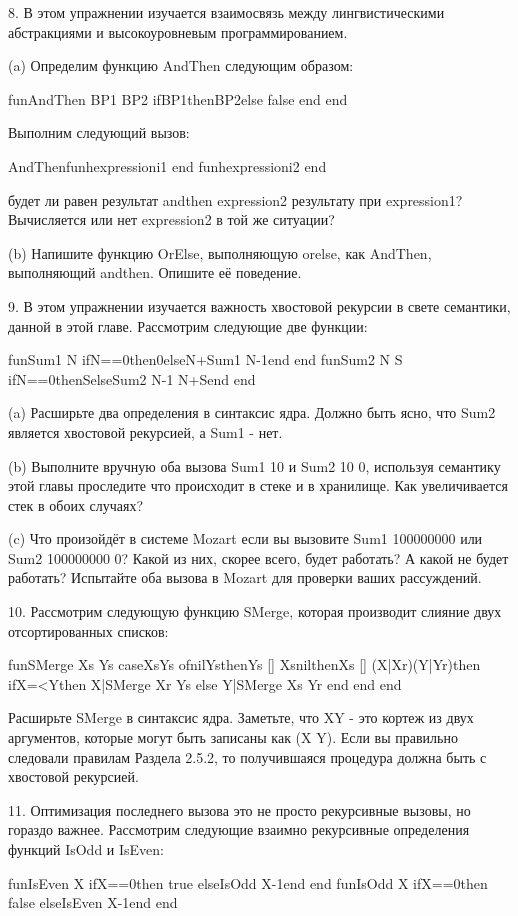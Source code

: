 8. В этом упражнении изучается взаимосвязь между лингвистическими абстракциями и высокоуровневым программированием.

(a) Определим функцию AndThen следующим образом:

fun{AndThen BP1 BP2}
if{BP1}then{BP2}else false end
end

Выполним следующий вызов:

{AndThenfun{}hexpressioni1 end
fun{}hexpressioni2 end}

будет ли равен результат andthen expression2 результату при expression1? Вычисляется или нет expression2 в той же ситуации?

(b) Напишите функцию OrElse, выполняющую orelse, как AndThen, выполняющий andthen. Опишите её поведение.

9. В этом упражнении изучается важность хвостовой рекурсии в свете семантики, данной в этой главе. Рассмотрим следующие две функции:

fun{Sum1 N}
ifN==0then0elseN+{Sum1 N-1}end
end
fun{Sum2 N S}
ifN==0thenSelse{Sum2 N-1 N+S}end
end

(a) Расширьте два определения в синтаксис ядра. Должно быть ясно, что Sum2 является хвостовой рекурсией, а Sum1 - нет.

(b) Выполните вручную оба вызова {Sum1 10} и {Sum2 10 0}, используя семантику этой главы проследите что происходит в стеке и в хранилище. Как увеличивается стек в обоих случаях?

(c) Что произойдёт в системе Mozart если вы вызовите {Sum1 100000000} или {Sum2 100000000 0}? Какой из них, скорее всего, будет работать? А какой не будет работать? Испытайте оба вызова в Mozart для проверки ваших рассуждений.

10. Рассмотрим следующую функцию SMerge, которая производит слияние двух отсортированных списков:

fun{SMerge Xs Ys}
caseXsYs
ofnilYsthenYs
[] XsnilthenXs
[] (X|Xr)(Y|Yr)then
ifX=<Ythen
X|{SMerge Xr Ys}
else
Y|{SMerge Xs Yr}
end
end
end

Расширьте SMerge в синтаксис ядра. Заметьте, что XY - это кортеж из двух аргументов, которые могут быть записаны как  (X Y). Если вы правильно следовали правилам Раздела 2.5.2, то получившаяся процедура должна быть с хвостовой рекурсией.

11. Оптимизация последнего вызова это не просто рекурсивные вызовы, но гораздо важнее. Рассмотрим следующие взаимно рекурсивные определения функций IsOdd и IsEven:

fun{IsEven X}
ifX==0then true else{IsOdd X-1}end
end
fun{IsOdd X}
ifX==0then false else{IsEven X-1}end
end


